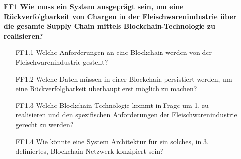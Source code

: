 \begin{itemize}
  \item[\textbf{FF1}] \textbf{Wie muss ein System ausgeprägt sein, um eine Rückverfolgbarkeit von Chargen in der Fleischwarenindustrie über die gesamte Supply Chain mittels Blockchain-Technologie zu realisieren?}
  \begin{itemize}
    \item[FF1.1] Welche Anforderungen an eine Blockchain werden von der Fleischwarenindustrie gestellt?
    \item[FF1.2] Welche Daten müssen in einer Blockchain persistiert werden, um eine Rückverfolgbarkeit überhaupt erst möglich zu machen?
    \item[FF1.3] Welche Blockchain-Technologie kommt in Frage um 1. zu realisieren und den spezifischen Anforderungen der Fleischwarenindustrie gerecht zu werden?
    \item[FF1.4] Wie könnte eine System Architektur für ein solches, in 3. definiertes, Blockchain Netzwerk konzipiert sein?
  \end{itemize}
\end{itemize}


\newpage
